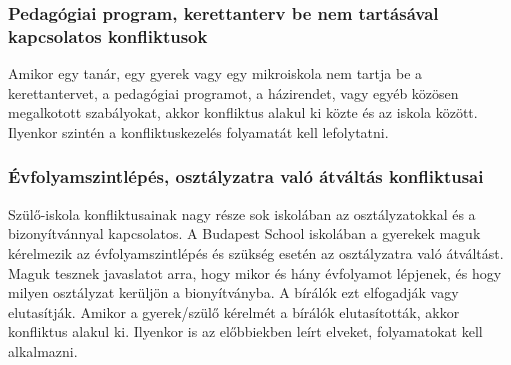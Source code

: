 \subsubsection{Pedagógiai program, kerettanterv be nem tartásával kapcsolatos konfliktusok}

Amikor egy tanár, egy gyerek vagy egy mikroiskola nem tartja be a kerettantervet, a pedagógiai programot, a házirendet, vagy egyéb közösen megalkotott szabályokat, akkor konfliktus alakul ki közte és az iskola között. Ilyenkor szintén a konfliktuskezelés folyamatát kell lefolytatni.

\subsubsection{Évfolyamszintlépés, osztályzatra való átváltás konfliktusai}
Szülő-iskola konfliktusainak nagy része sok iskolában az osztályzatokkal és a bizonyítvánnyal kapcsolatos. A Budapest School iskolában a gyerekek maguk kérelmezik az évfolyamszintlépés és szükség esetén az osztályzatra való átváltást. Maguk tesznek javaslatot arra, hogy mikor és hány évfolyamot lépjenek, és hogy milyen osztályzat kerüljön a bionyítványba. A bírálók ezt elfogadják vagy elutasítják. Amikor a gyerek/szülő kérelmét a bírálók elutasították, akkor konfliktus alakul ki. Ilyenkor is az előbbiekben leírt elveket, folyamatokat kell alkalmazni.